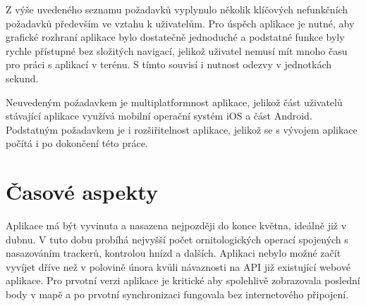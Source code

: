 Z výše uvedeného seznamu požadavků vyplynulo několik klíčových nefunkčních požadavků především ve vztahu k uživatelům. Pro úspěch aplikace je nutné, aby grafické rozhraní aplikace bylo dostatečně jednoduché a podstatné funkce byly rychle přístupné bez složitých navigací, jelikož uživatel nemusí mít mnoho času pro práci s aplikací v terénu. S tímto souvisí i nutnost odezvy v jednotkách sekund. 

Neuvedeným požadavkem je multiplatformnost aplikace, jelikož část uživatelů stávající aplikace využívá mobilní operační systém iOS a část Android. Podstatným požadavkem je i rozšiřitelnost aplikace, jelikož se s vývojem aplikace počítá i po dokončení této práce.

\section{Časové aspekty}

Aplikace má být vyvinuta a nasazena nejpozději do konce května, ideálně již v dubnu. V tuto dobu probíhá nejvyšší počet ornitologických operací spojených s nasazováním trackerů, kontrolou hnízd a dalších. Aplikaci nebylo možné začít vyvíjet dříve než v polovině února kvůli návaznosti na API již existující webové aplikace. Pro prvotní verzi aplikace je kritické aby spolehlivě zobrazovala poslední body v mapě a po prvotní synchronizaci fungovala bez internetového připojení.
